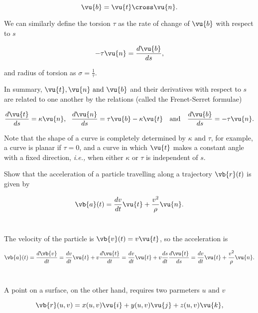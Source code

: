 \documentclass[english,a4paper,12pt]{report}
\begin{document}
\begin{equation}
	\vu{b} = \vu{t} \cross \vu{n} .
\end{equation}

We can similarly define the torsion \(\tau \) as the rate of change of \(\vu{b} \) with respect to \(s\)  

\begin{equation}
	-\tau \vu{n} =  \frac{d \vu{b} }{ds}, 
\end{equation}

and radius of torsion as \(\displaystyle \sigma  = \frac{1}{\tau } \). 

In summary, \(\vu{t} , \vu{n} \text { and } \vu{b} \) and their derivatives with respect to \(s\) are related to one another by the relations (called the Frenet-Serret formulae) 

\begin{equation}
	\frac{d \vu{t} }{ds} = \kappa \vu{n} , ~~\frac{d \vu{n} }{ds} = \tau \vu{b} - \kappa \vu{t}~~ \text { and } ~~\frac{d \vu{b} }{ds} = -\tau \vu{n} .  
\end{equation}

Note that the shape of a curve is completely determined by \(\kappa \text { and } \tau \), for example, a curve is planar if \(\tau = 0\), and a curve in which \(\vu{t} \) makes a constant angle with a fixed direction, \textit{i.e.,} when either \(\kappa \text { or } \tau \) is independent of \(s\).    

{Show that the acceleration of a particle travelling along a trajectory \(\vb{r} (t)\) is given by 

\begin{equation}
	\vb{a} (t) = \frac{dv}{dt} \vu{t} + \frac{v^2}{\rho } \vu{n} .  
\end{equation}
~
}
{The velocity of the particle is \(\vb{v} (t) = v \vu{t} \), so the acceleration is 

\begin{equation}
	\vb{a} (t) = \frac{d\vb{v} }{dt} = \frac{dv}{dt} \vu{t} + v \frac{d \vu{t} }{dt} = \frac{dv}{dt}\vu{t} + v \frac{ds}{dt}\frac{d \vu{t} }{ds} = \frac{dv}{dt} \vu{t} + \frac{v^2}{\rho }\vu{n} .       
\end{equation}
~
}

A point on a surface, on the other hand, requires two parmeters \(u \text { and } v\) 

\begin{equation}
	\vb{r} (u,v)  = x(u,v) \vu{i} + y(u,v) \vu{j} + z(u,v) \vu{k},
\end{equation}
\end{document}
